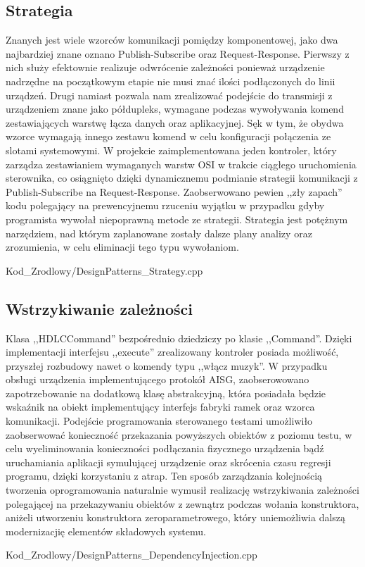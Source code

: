     \subsection{Strategia}
        Znanych jest wiele wzorców komunikacji pomiędzy komponentowej, jako dwa najbardziej znane oznano Publish-Subscribe oraz Request-Response.
        Pierwszy z nich służy efektownie realizuje odwrócenie zależności ponieważ urządzenie nadrzędne na początkowym etapie nie musi znać
        ilości podłączonych do linii urządzeń. Drugi namiast pozwala nam zrealizować podejście do transmisji z urządzeniem znane jako półdupleks, wymagane podczas
        wywoływania komend zestawiających warstwę łącza danych oraz aplikacyjnej. Sęk w tym, że obydwa wzorce wymagają innego zestawu komend w celu
        konfiguracji połączenia ze slotami systemowymi. W projekcie zaimplementowana jeden kontroler, który zarządza zestawianiem wymaganych warstw OSI w trakcie
        ciągłego uruchomienia sterownika, co osiągnięto dzięki dynamicznemu podmianie strategii komunikacji z Publish-Subscribe na Request-Response.
        Zaobserwowano pewien ,,zły zapach'' kodu polegający na prewencyjnemu rzuceniu wyjątku w przypadku gdyby programista wywołał niepoprawną metode ze strategii.
        Strategia jest potężnym narzędziem, nad którym zaplanowane zostały dalsze plany analizy oraz zrozumienia, w celu eliminacji tego typu wywołaniom.
        
        {Kod_Zrodlowy/DesignPatterns_Strategy.cpp}
    \newpage
    \subsection{Wstrzykiwanie zależności}
        Klasa ,,HDLCCommand'' bezpośrednio dziedziczy po klasie ,,Command''. Dzięki implementacji interfejsu ,,execute'' zrealizowany kontroler posiada możliwość,
        przyszłej rozbudowy nawet o komendy typu ,,włącz muzyk''. W przypadku obsługi urządzenia implementującego protokół AISG, zaobserowowano zapotrzebowanie
        na dodatkową klasę abstrakcyjną, która posiadała będzie wskaźnik na obiekt implementujący interfejs fabryki ramek oraz wzorca komunikacji.
        Podejście programowania sterowanego testami umożliwiło zaobserwować konieczność przekazania powyższych obiektów z poziomu testu, w celu wyeliminowania
        konieczności podłączania fizycznego urządzenia bądź uruchamiania aplikacji symulującej urządzenie oraz skrócenia czasu regresji programu, dzięki
        korzystaniu z atrap.
        Ten sposób zarządzania kolejnością tworzenia oprogramowania naturalnie wymusił realizację wstrzykiwania zależności polegającej na
        przekazywaniu obiektów z zewnątrz podczas wołania konstruktora, aniżeli utworzeniu konstruktora zeroparametrowego, który uniemożliwia 
        dalszą modernizacjię elementów składowych systemu.
        
        {Kod_Zrodlowy/DesignPatterns_DependencyInjection.cpp}
